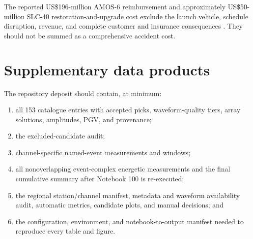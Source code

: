 \documentclass[]{seismica}
\begin{document}
The reported US\$196-million AMOS-6 reimbursement and approximately
US\$50-million SLC-40 restoration-and-upgrade cost exclude the launch vehicle,
schedule disruption, revenue, and complete customer and insurance consequences
\citep{magan_amos6_2016,clark_slc40_2017}. They should not be summed as a
comprehensive accident cost.

\section{Supplementary data products}

The repository deposit should contain, at minimum:
\begin{enumerate}
  \item all 153 catalogue entries with accepted picks, waveform-quality tiers,
        array solutions, amplitudes, PGV, and provenance;
  \item the excluded-candidate audit;
  \item channel-specific named-event measurements and windows;
  \item all nonoverlapping event-complex energetic measurements and the final
        cumulative summary after Notebook 100 is re-executed;
  \item the regional station/channel manifest, metadata and waveform
        availability audit, automatic metrics, candidate plots, and manual
        decisions; and
  \item the configuration, environment, and notebook-to-output manifest needed
        to reproduce every table and figure.
\end{enumerate}


\end{document}
